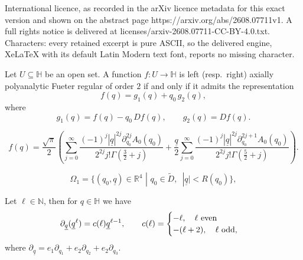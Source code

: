\documentclass[10pt,a4paper]{amsart}
\begin{document}
International licence, as recorded in the arXiv licence metadata for this exact version and shown on the abstract page https://arxiv.org/abs/2608.07711v1. A full rights notice is delivered at licenses/arxiv-2608.07711-CC-BY-4.0.txt. Characters: every retained excerpt is pure ASCII, so the delivered engine, XeLaTeX with its default Latin Modern text font, reports no missing character.
\begin{proposition}
\label{decof}
Let $U \subseteq \mathbb{H}$ be an open set. A function $f \colon U \to \mathbb{H}$ is left (resp.\ right) axially polyanalytic Fueter regular of order $2$ if and only if it admits the representation
$$
f(q)= g_1(q)+ q_0\, g_2(q),
$$
where
\begin{equation}
	\label{g12}
	g_1(q)= f(q)- q_0\, Df(q),
	\qquad
	g_2(q)= Df(q).
\end{equation}
\end{proposition}

\begin{equation}
	\label{seriesexp}
	f(q)= \frac{\sqrt{\pi}}{2}\left( \sum_{j=0}^\infty \frac{(-1)^j |\underline{q}|^{2j} \partial_{q_0}^{2j} A_0(q_0)}{2^{2j}j! \Gamma \left(\frac{3}{2}+j\right)}+ \frac{\underline{q} }{2} \sum_{j=0}^\infty \frac{(-1)^j |\underline{q}|^{2j} \partial_{q_0}^{2j+1}A_0(q_0)}{2^{2j}j! \Gamma \left(\frac{5}{2}+j\right)} \right).
\end{equation}

\begin{equation}
\label{Stefano1}
\Omega_1=  \{(q_0, \underline{q}) \in \mathbb{R}^4 \, \, |\, \, q_0 \in \tilde{D}, \, \, \, |\underline{q}|< R(q_0)\},
\end{equation}

\begin{lemma}
	Let $ \ell  \in \mathbb{N}$, then for $q \in \mathbb{H}$ we have
	\begin{equation}
		\label{f1}
		\partial_{\underline{q}}(\underline{q}^\ell)= c(\ell) \underline{q}^{\ell-1}, \qquad c(\ell)=\begin{cases}
			- \ell, \quad \ell \, \, \hbox{even}\\
			-(\ell+2), \quad \ell \, \, \hbox{odd},
		\end{cases}
	\end{equation}
where $\partial_{\underline{q}}= e_1 \partial_{q_1}+e_2 \partial_{q_2}+e_2 \partial_{q_3}$.
\end{lemma}
\end{document}
